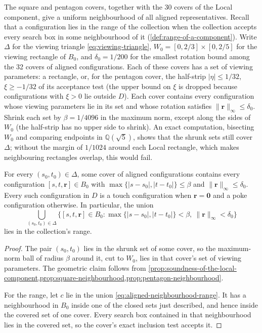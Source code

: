 The square and pentagon covers, together with the 30 covers of the Local
component, give a uniform neighbourhood of all aligned representatives.
Recall that a configuration lies in the range of the collection when the
collection accepts every search box in some neighbourhood of it
(\cref{def:range-of-a-component}). Write $\Delta$ for the viewing triangle
\cref{eq:viewing-triangle}, $W_0=[0,2/3]\times[0,2/5]$ for the viewing
rectangle of $B_0$, and $\delta_0=1/200$ for the smallest rotation bound
among the 32 covers of aligned configurations. Each of these covers has a
set of viewing parameters: a rectangle, or, for the pentagon cover, the
half-strip $|\eta|\le1/32$, $\xi\ge-1/32$ of its acceptance test (the upper
bound on $\xi$ is dropped because configurations with $\xi>0$ lie outside
$D$). Each cover contains every configuration whose viewing parameters lie
in its set and whose rotation satisfies
$\lVert\mathbf r\rVert_\infty\le\delta_0$. Shrink each set by $\beta=1/4096$ in
the maximum norm, except along the sides of $W_0$ (the half-strip has no
upper side to shrink). An
exact computation, bisecting $W_0$ and comparing endpoints in
$\mathbb Q(\sqrt5)$, shows that the shrunk sets still cover $\Delta$; without
the margin of $1/1024$ around each Local rectangle, which makes neighbouring rectangles overlap, this would
fail.

\begin{proposition}\label{prop:aligned-neighbourhood}
  For every $(s_0,t_0)\in\Delta$, some cover of aligned configurations contains
  every configuration $[s,t,\mathbf r]\in B_0$ with
  $\max\{|s-s_0|,|t-t_0|\}\le\beta$ and $\lVert\mathbf r\rVert_\infty\le\delta_0$. Every
  such configuration in $D$ is a touch configuration when $\mathbf r=\mathbf0$ and a
  poke configuration otherwise. In particular, the union
  \begin{equation}\label{eq:aligned-neighbourhood-range}
    \bigcup_{(s_0,t_0)\in\Delta}\bigl\{[s,t,\mathbf r]\in B_0:
      \max\{|s-s_0|,|t-t_0|\}<\beta,\ \lVert\mathbf r\rVert_\infty<\delta_0\bigr\}
  \end{equation}
  lies in the collection's range.
\end{proposition}
\begin{proof}
  The pair $(s_0,t_0)$ lies in the shrunk set of some cover, so the
  maximum-norm ball of radius $\beta$ around it, cut to $W_0$, lies in that
  cover's set of viewing parameters. The geometric claim follows from
  \cref{prop:soundness-of-the-local-component,prop:square-neighbourhood,prop:pentagon-neighbourhood}.

  For the range, let $c$ lie in the union \cref{eq:aligned-neighbourhood-range}.
  It has a neighbourhood in $B_0$ inside one of the closed sets just
  described, and hence inside the covered set of one cover. Every search
  box contained in that neighbourhood lies in the covered set, so the
  cover's exact inclusion test accepts it.
\end{proof}

